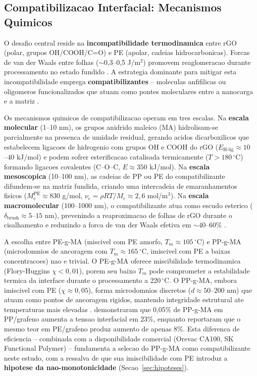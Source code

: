 \documentclass[11pt,a4paper,oneside]{article}
\begin{document}
\subsection{Compatibilizacao Interfacial: Mecanismos Quimicos}

O desafio central reside na {\bfseries incompatibilidade termodinamica} entre rGO (polar, grupos OH/COOH/C=O) e PE (apolar, cadeias hidrocarbonicas). Forcas de van der Waals entre folhas (${\sim}$0,3--0,5 J/m$^2$) promovem reaglomeracao durante processamento no estado fundido \cite{Kim2010}. A estrategia dominante para mitigar esta incompatibilidade emprega {\bfseries compatibilizantes} -- moleculas anfifilicas ou oligomeros funcionalizados que atuam como pontes moleculares entre a nanocarga e a matriz \cite{Rasselet2019, Natarajan2020, Sanchez2018}.

Os mecanismos quimicos de compatibilizacao operam em tres escalas. Na {\bfseries escala molecular} (1--10 nm), os grupos anidrido maleico (MA) hidrolisam-se parcialmente na presenca de umidade residual, gerando acidos dicarboxilicos que estabelecem ligacoes de hidrogenio com grupos OH e COOH do rGO ($E_{\text{H-lig}}{\approx}10$--$40$ kJ/mol) e podem sofrer esterificacao catalisada termicamente ($T{>}180\,^{\circ}$C) formando ligacoes covalentes (C--O--C, $E{\approx}350$ kJ/mol). Na {\bfseries escala mesoscopica} (10--100 nm), as cadeias de PP ou PE do compatibilizante difundem-se na matriz fundida, criando uma intercadeia de emaranhamentos fisicos ($M_e^{\text{PE}}{\approx}830$ g/mol, $\nu_e{=}\rho RT/M_e{\approx}2{,}6$ mol/m$^3$). Na {\bfseries escala macromolecular} (100--1000 nm), o compatibilizante atua como escudo esterico ($\delta_{\text{brush}}{\approx}5$--$15$ nm), prevenindo a reaproximacao de folhas de rGO durante o cisalhamento e reduzindo a forca de van der Waals efetiva em ${\sim}40$--$60\%$ \cite{Sanes2020}.

A escolha entre PE-g-MA (miscivel com PE amorfo, $T_m{\approx}105\,^{\circ}$C) e PP-g-MA (microdomnios de ancoragem com $T_m{\approx}165\,^{\circ}$C, imiscivel com PE a baixas concentracoes) nao e trivial. O PE-g-MA oferece miscibilidade termodinamica (Flory-Huggins $\chi{<}0{,}01$), porem seu baixo $T_m$ pode comprometer a estabilidade termica da interface durante o processamento a 220$\,^{\circ}$C. O PP-g-MA, embora imiscivel com PE ($\chi{\approx}0{,}05$), forma microdomnios discretos ($d{\approx}50$--$200$ nm) que atuam como pontos de ancoragem rigidos, mantendo integridade estrutural ate temperaturas mais elevadas \cite{Lopez2021}. \citet{Natarajan2020} demonstraram que 0,05\% de PP-g-MA em PP/grafeno aumenta a tensao interfacial em 23\%, enquanto \citet{Sanchez2018} reportaram que o mesmo teor em PE/grafeno produz aumento de apenas 8\%. Esta diferenca de eficiencia -- combinada com a disponibilidade comercial (Orevac CA100, SK Functional Polymer) -- fundamenta a selecao do PP-g-MA como compatibilizante neste estudo, com a ressalva de que sua imiscibilidade com PE introduz a {\bfseries hipotese da nao-monotonicidade} (Secao~\ref{sec:hipoteses}).
\end{document}
